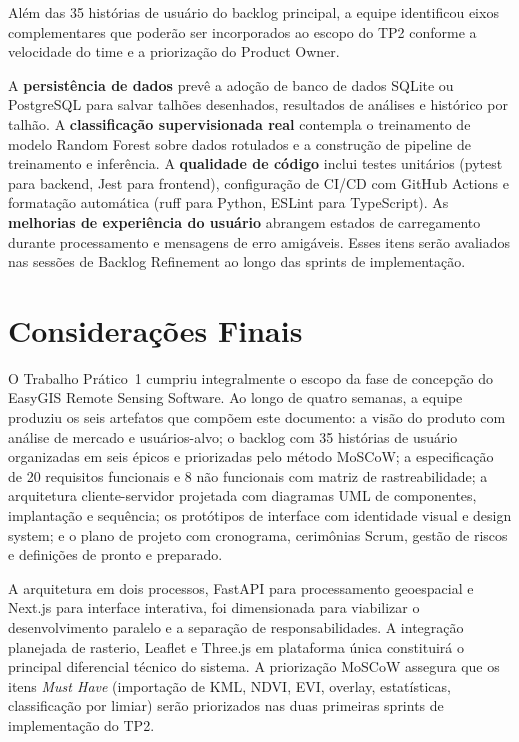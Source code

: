 \documentclass[12pt, a4paper]{article}
\begin{document}
Além das 35 histórias de usuário do backlog principal, a equipe identificou eixos complementares que poderão ser incorporados ao escopo do TP2 conforme a velocidade do time e a priorização do Product Owner.

A \textbf{persistência de dados} prevê a adoção de banco de dados SQLite ou PostgreSQL para salvar talhões desenhados, resultados de análises e histórico por talhão. A \textbf{classificação supervisionada real} contempla o treinamento de modelo Random Forest sobre dados rotulados e a construção de pipeline de treinamento e inferência. A \textbf{qualidade de código} inclui testes unitários (pytest para backend, Jest para frontend), configuração de CI/CD com GitHub Actions e formatação automática (ruff para Python, ESLint para TypeScript). As \textbf{melhorias de experiência do usuário} abrangem estados de carregamento durante processamento e mensagens de erro amigáveis. Esses itens serão avaliados nas sessões de Backlog Refinement ao longo das sprints de implementação.

\section{Considerações Finais}

O Trabalho Prático~1 cumpriu integralmente o escopo da fase de concepção do EasyGIS Remote Sensing Software. Ao longo de quatro semanas, a equipe produziu os seis artefatos que compõem este documento: a visão do produto com análise de mercado e usuários-alvo; o backlog com 35 histórias de usuário organizadas em seis épicos e priorizadas pelo método MoSCoW; a especificação de 20 requisitos funcionais e 8 não funcionais com matriz de rastreabilidade; a arquitetura cliente-servidor projetada com diagramas UML de componentes, implantação e sequência; os protótipos de interface com identidade visual e design system; e o plano de projeto com cronograma, cerimônias Scrum, gestão de riscos e definições de pronto e preparado.

A arquitetura em dois processos, FastAPI para processamento geoespacial e Next.js para interface interativa, foi dimensionada para viabilizar o desenvolvimento paralelo e a separação de responsabilidades. A integração planejada de rasterio, Leaflet e Three.js em plataforma única constituirá o principal diferencial técnico do sistema. A priorização MoSCoW assegura que os itens \textit{Must Have} (importação de KML, NDVI, EVI, overlay, estatísticas, classificação por limiar) serão priorizados nas duas primeiras sprints de implementação do TP2.
\end{document}
